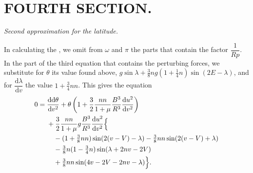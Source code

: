 \clearpage
\begingroup
{}
\renewcommand{\headrulewidth}{0pt}
\section*{FOURTH SECTION.}
\begin{center}
\itshape Second approximation for the latitude.
\end{center}

\par\noindent\hspace*{\parindent}In calculating the , we omit from \(\omega\) and \(\pi\) the parts that
contain the factor \(\dfrac{1}{Rp}\). In the part of the third equation that contains the
perturbing forces, we substitute for \(\theta\) its value found above,
\(g\sin\lambda+\tfrac38ng(1+\tfrac14n)\sin(2E-\lambda)\), and for
\(\dfrac{\mathrm{d}\lambda}{\mathrm{d}v}\) the value \(1+\tfrac34nn\). This gives the equation
\[
\begin{aligned}
0={}&\frac{\mathrm{dd}\theta}{\mathrm{d}v^2}
+\theta\left(1+\frac32\frac{nn}{1+\mu}\frac{B^3}{R^3}
\frac{\mathrm{d}u^2}{\mathrm{d}v^2}\right)\\
&+\frac32\frac{nn}{1+\mu}g\frac{B^3}{R^3}\frac{\mathrm{d}u^2}{\mathrm{d}v^2}\Bigl\{\\
&\quad -(1+\tfrac38nn)\sin(2(v-V)-\lambda)
-\tfrac38nn\sin(2(v-V)+\lambda)\\
&\quad -\tfrac38n(1-\tfrac34n)\sin(\lambda+2nv-2V)\\
&\quad +\tfrac38nn\sin(4v-2V-2nv-\lambda)\Bigr\}.
\end{aligned}
\]

